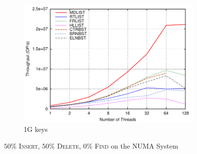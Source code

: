\documentclass[10pt,conference,compsocconf]{IEEEtran}
\begin{document}
\begin{figure}[t]
\begin{subfigure}{0.32\textwidth}
        \includegraphics[width=1\columnwidth]{./data/amd50ins1Bkey}
        \caption{1G keys}
        \label{fig:1b50ins}
    \end{subfigure}
    \vspace{-0.08in}
    \caption{$50\%$ \textsc{Insert}, $50\%$ \textsc{Delete}, $0\%$ \textsc{Find} on the NUMA System}
    \label{fig:writeload}
\end{figure}
\end{document}
